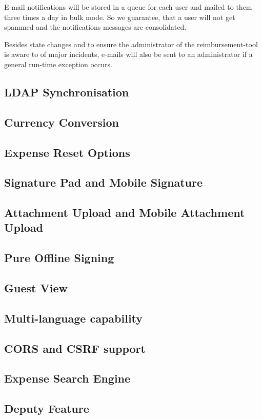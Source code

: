E-mail notifications will be stored in a queue for each user and mailed to them three times a day in bulk mode. So we guarantee, that a user will not get spammed and the notifications messages are consolidated.

Besides state changes and to ensure the administrator of the reimbursement-tool is aware to of major incidents, e-mails will also be sent to an administrator if a general run-time exception occurs.

\subsection{LDAP Synchronisation}
\subsection{Currency Conversion}
\subsection{Expense Reset Options}
\subsection{Signature Pad and Mobile Signature}
\subsection{Attachment Upload and Mobile Attachment Upload}
\subsection{Pure Offline Signing}
\subsection{Guest View}
\subsection{Multi-language capability}
\subsection{CORS and CSRF support}
\subsection{Expense Search Engine}
\subsection{Deputy Feature}
